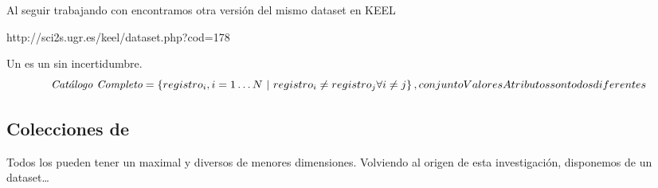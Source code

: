 \ABIERTO
Al seguir trabajando con \mushroom encontramos otra versión del mismo dataset en KEEL

http://sci2s.ugr.es/keel/dataset.php?cod=178


\begin{Definition}[\CC] Un \CC es un \catalogo sin incertidumbre.
   $$\CC = \left\{registro_i, i = 1\ldots N\ | \ registro_i \neq registro_j \forall i \neq j\right\},  conjuntoValoresAtributos son todos diferentes$$
\label{def:catalogo-completo}
\end{Definition}






\subsection{Colecciones de \CCs}
\label{sec:clasificacion:catalogo-comprimido:colecciones}
%

Todos los \CCs pueden tener un \CC maximal y diversos \CCs de menores dimensiones. Volviendo al origen de esta investigación, disponemos de un dataset\ldots
